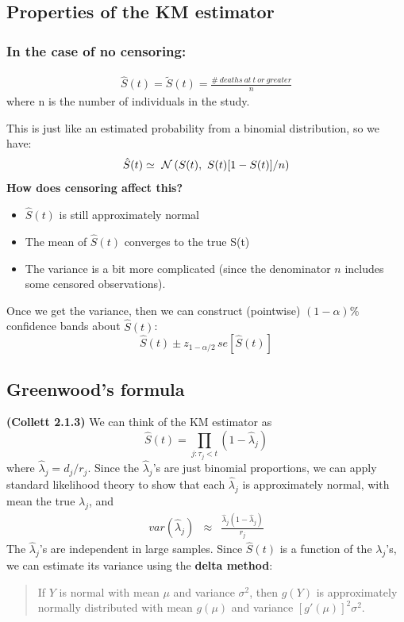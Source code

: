 \documentclass[11pt,slidesonly,semrot,portrait,palatino]{book}
\begin{document}
\subsection{Properties of the KM estimator}
\subsubsection{In the case of no censoring:}
\begin{eqnarray*}
\hat{S}(t) = \tilde{S}(t) = \frac{\#~deaths~at~ t~ or~ greater}{n}
\end{eqnarray*}
\vspace*{.2in}
where n is the number of individuals in the study.

This is just like an estimated probability from
a binomial distribution, so we have:
\[  \hat{S}(t) \simeq ~{\cal N}\left(S(t),~S(t)[1-S(t)]/n\right)   \]
{\bf How does censoring affect this?}
    \begin{itemize}
\item  $\hat{S}(t)$ is still approximately normal
\item  The mean of $\hat{S}(t)$ converges to the true S(t)
\item  The variance is a bit more complicated (since the denominator
$n$ includes some censored observations).
\end{itemize}
Once we get the variance, then we can construct (pointwise)
$(1-\alpha)$\% confidence
bands about $\hat{S}(t)$:
\[   \hat{S}(t)  \pm z_{1-\alpha/2} \, se[\hat{S}(t)] \]

\subsection{Greenwood's formula}
{\bf (Collett 2.1.3)} We can think of the KM estimator as
\[  \hat{S}(t) = \prod_{j: \tau_j < t} (1-\hat{\lambda}_j) \]
where $\hat{\lambda}_j = d_j / r_j.$
Since the $\hat\lambda_j$'s are just binomial proportions, we can
apply standard likelihood theory to show that each $\hat{\lambda}_j$ is
approximately normal, with mean the true $\lambda_j$, and
\begin{eqnarray*}
var(\hat    {\lambda}_j) & \approx &
\frac{\hat{\lambda}_j (1-\hat{\lambda}_j)}{r_j}
\end{eqnarray*}
The $\hat{\lambda}_j$'s are independent in large samples.
Since $\hat{S}(t)$ is a function of the $\lambda_j$'s, we
can estimate its variance using the {\bf delta method}:
\begin{quote}
If $Y$ is normal with mean $\mu$ and variance $\sigma^2$,
then $g(Y)$ is approximately normally distributed with
mean $g(\mu)$ and variance $[g'(\mu)]^2 \sigma^2$.
\end{quote}
\end{document}
